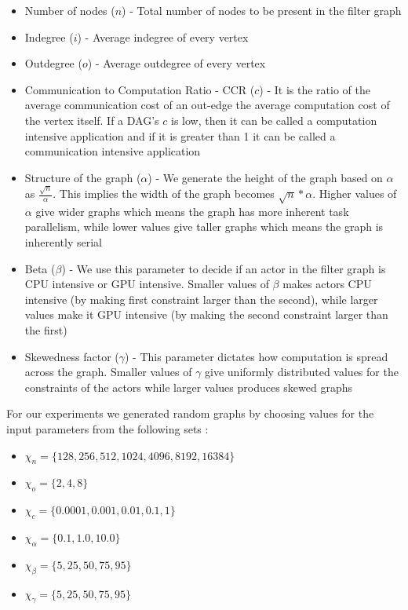 \begin{itemize}
\item Number of nodes ($n$) - Total number of nodes to be present in the
  filter graph
\item Indegree ($i$) - Average indegree of every vertex
\item Outdegree ($o$) - Average outdegree of every vertex
\item Communication to Computation Ratio - CCR ($c$) - It is the ratio
  of the average communication cost of an out-edge the average
  computation cost of the vertex itself. If a DAG's $c$ is low, then it
  can be called a computation intensive application and if it is greater
  than 1 it can be called a communication intensive application
\item Structure of the graph ($\alpha$) - We generate the height of the
  graph based on $\alpha$ as $\frac{\sqrt{n}}{\alpha}$. This implies the
  width of the graph becomes $\sqrt{n}*{\alpha}$. Higher values of
  $\alpha$ give wider graphs which means the graph has more inherent
  task parallelism, while lower values give taller graphs which means
  the graph is inherently serial
\item Beta ($\beta$) - We use this parameter to decide if an actor in
  the filter graph is CPU intensive or GPU intensive. Smaller values of
  $\beta$ makes actors CPU intensive (by making first constraint larger
  than the second), while larger values make it GPU intensive (by making
  the second constraint larger than the first)
\item Skewedness factor ($\gamma$) - This parameter dictates how
  computation is spread across the graph. Smaller values of $\gamma$
  give uniformly distributed values for the constraints of the actors
  while larger values produces skewed graphs
\end{itemize}

For our experiments we generated random graphs by choosing values for the input
parameters from the following sets :

\begin{itemize}
\item $\chi_{n} = \{128, 256, 512, 1024, 4096, 8192, 16384\}$
\item $\chi_{o} = \{2, 4, 8\}$
\item $\chi_{c} = \{0.0001, 0.001, 0.01, 0.1, 1\}$
\item $\chi_{\alpha} = \{0.1, 1.0, 10.0\}$
\item $\chi_{\beta} = \{5, 25, 50, 75, 95\}$
\item $\chi_{\gamma} = \{5, 25, 50, 75, 95\}$
\end{itemize}

